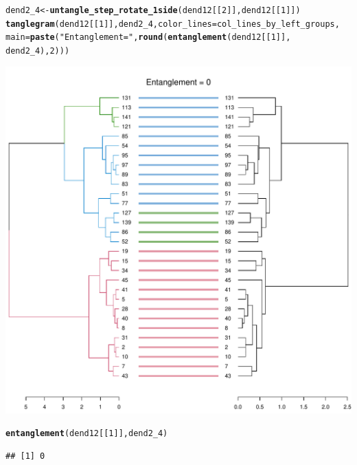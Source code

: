 \documentclass[shortnames,nojss,article]{jss}\usepackage[]{graphicx}\usepackage[]{color}
\makeatletter
\def\maxwidth{ %
  \ifdim\Gin@nat@width>\linewidth
    \linewidth
  \else
    \Gin@nat@width
  \fi
}
\newcommand{\hlnum}[1]{\textcolor[rgb]{0.686,0.059,0.569}{#1}}%
\newcommand{\hlstr}[1]{\textcolor[rgb]{0.192,0.494,0.8}{#1}}%
\newcommand{\hlstd}[1]{\textcolor[rgb]{0.345,0.345,0.345}{#1}}%
\newcommand{\hlkwb}[1]{\textcolor[rgb]{0.69,0.353,0.396}{#1}}%
\newcommand{\hlkwc}[1]{\textcolor[rgb]{0.333,0.667,0.333}{#1}}%
\newcommand{\hlkwd}[1]{\textcolor[rgb]{0.737,0.353,0.396}{\textbf{#1}}}%
\newenvironment{kframe}{%
 \def\at@end@of@kframe{}%
 \ifinner\ifhmode%
  \def\at@end@of@kframe{\end{minipage}}%
  \begin{minipage}{\columnwidth}%
 \fi\fi%
 \def\FrameCommand##1{\hskip\@totalleftmargin \hskip-\fboxsep
 \colorbox{shadecolor}{##1}\hskip-\fboxsep
     \hskip-\linewidth \hskip-\@totalleftmargin \hskip\columnwidth}%
 \MakeFramed {\advance\hsize-\width
   \@totalleftmargin\z@ \linewidth\hsize
   \@setminipage}}%
 {\par\unskip\endMakeFramed%
 \at@end@of@kframe}
\newenvironment{knitrout}{}{} %
\makeatother
\begin{document}
\begin{knitrout}
\color{fgcolor}\begin{kframe}
\begin{alltt}
\hlstd{dend2_4} \hlkwb{<-} \hlkwd{untangle_step_rotate_1side}\hlstd{(dend12[[}\hlnum{2}\hlstd{]], dend12[[}\hlnum{1}\hlstd{]])}
\hlkwd{tanglegram}\hlstd{(dend12[[}\hlnum{1}\hlstd{]], dend2_4,} \hlkwc{color_lines} \hlstd{= col_lines_by_left_groups,}
    \hlkwc{main} \hlstd{=} \hlkwd{paste}\hlstd{(}\hlstr{"Entanglement ="}\hlstd{,} \hlkwd{round}\hlstd{(}\hlkwd{entanglement}\hlstd{(dend12[[}\hlnum{1}\hlstd{]],}
        \hlstd{dend2_4),} \hlnum{2}\hlstd{)))}
\end{alltt}
\end{kframe}

{\centering \includegraphics[width=\maxwidth]{figure/unnamed-chunk-38} 

}


\begin{kframe}\begin{alltt}
\hlkwd{entanglement}\hlstd{(dend12[[}\hlnum{1}\hlstd{]], dend2_4)}
\end{alltt}
\begin{verbatim}
## [1] 0
\end{verbatim}
\begin{alltt}

\end{alltt}
\end{kframe}
\end{knitrout}
\end{document}
